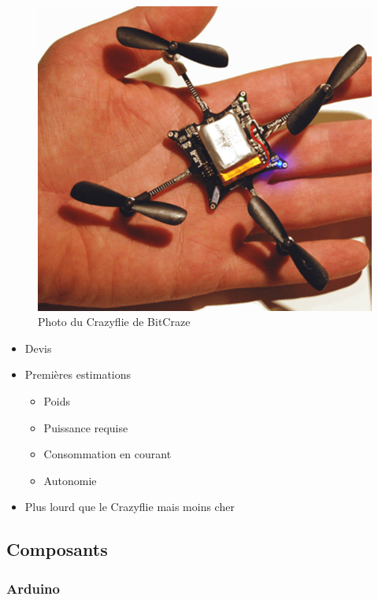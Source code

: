 \documentclass{beamer}
\begin{document}
{	\begin{frame}
	  \begin{figure}[htbp]
	    \centering
	    \includegraphics[scale=0.2]{img/crazyflie.png}
	    \caption{Photo du Crazyflie de BitCraze}
	  \end{figure} 
	\end{frame}

	\begin{frame}
	  \begin{itemize}
	    \item Devis
	    \item Premières estimations
	    \begin{itemize}
	      \item Poids
	      \item Puissance requise
	      \item Consommation en courant
	      \item Autonomie
	    \end{itemize}
	    \item Plus lourd que le Crazyflie mais moins cher
	  \end{itemize}
	\end{frame}
      
      \subsection{Composants}
	\begin{frame} %
	  \frametitle{Arduino}
	

\end{frame}}
\end{document}
